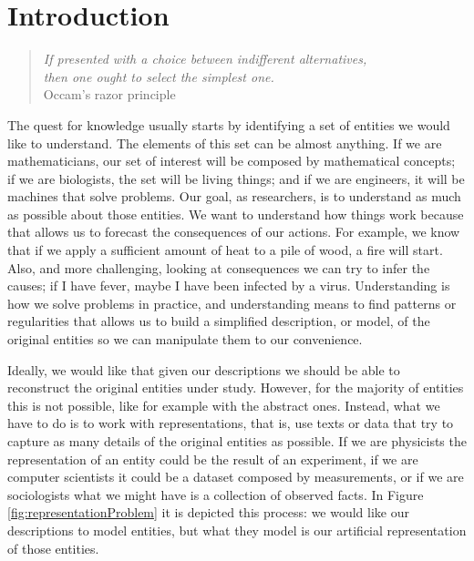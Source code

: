 %
%


\chapter{Introduction}
\label{chap:Introduction}

\begin{quote}
\begin{flushright}
\emph{If presented with a choice between indifferent alternatives,\\
then one ought to select the simplest one.}\\
Occam’s razor principle 
\end{flushright}
\end{quote}
\bigskip

The quest for knowledge usually starts by identifying a set of entities we would like to understand. The elements of this set can be almost anything. If we are mathematicians, our set of interest will be composed by mathematical concepts; if we are biologists, the set will be living things; and if we are engineers, it will be machines that solve problems. Our goal, as researchers, is to understand as much as possible about those entities. We want to understand how things work because that allows us to forecast the consequences of our actions. For example, we know that if we apply a sufficient amount of heat to a pile of wood, a fire will start. Also, and more challenging, looking at consequences we can try to infer the causes; if I have fever, maybe I have been infected by a virus. Understanding is how we solve problems in practice, and understanding means to find patterns or regularities that allows us to build a simplified description, or model, of the original entities so we can manipulate them to our convenience.

Ideally, we would like that given our descriptions we should be able to reconstruct the original entities under study. However, for the majority of entities this is not possible, like for example with the abstract ones. Instead, what we have to do is to work with representations, that is, use texts or data that try to capture as many details of the original entities as possible. If we are physicists the representation of an entity could be the result of an experiment, if we are computer scientists it could be a dataset composed by measurements, or if we are sociologists what we might have is a collection of observed facts. In Figure \ref{fig:representationProblem} it is depicted this process: we would like our descriptions to model entities, but what they model is our artificial representation of those entities.


